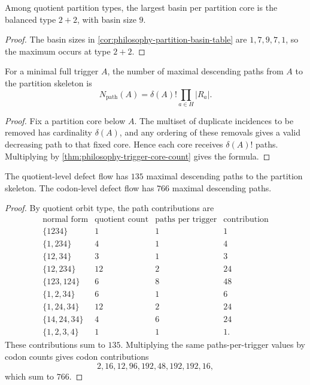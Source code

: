 \begin{corollary}
\label{cor:philosophy-balanced-basin-maximum}
Among quotient partition types, the largest basin per partition core is
the balanced type $2+2$, with basin size $9$.
\end{corollary}
\begin{proof}
The basin sizes in \autoref{cor:philosophy-partition-basin-table} are
$1,7,9,7,1$, so the maximum occurs at type $2+2$.
\end{proof}

\begin{theorem}
\label{thm:philosophy-descending-path-count}
For a minimal full trigger $A$, the number of maximal descending paths
from $A$ to the partition skeleton is
$$
  N_{\mathrm{path}}(A)
  =
  \delta(A)!
  \prod_{a\in H}|R_{a}|.
$$
\end{theorem}
\begin{proof}
Fix a partition core below $A$. The multiset of duplicate incidences to
be removed has cardinality $\delta(A)$, and any ordering of these
removals gives a valid decreasing path to that fixed core. Hence each
core receives $\delta(A)!$ paths. Multiplying by
\autoref{thm:philosophy-trigger-core-count} gives the formula.
\end{proof}

\begin{theorem}
\label{thm:philosophy-total-descending-paths}
The quotient-level defect flow has $135$ maximal descending paths to the
partition skeleton. The codon-level defect flow has $766$ maximal
descending paths.
\end{theorem}
\begin{proof}
By quotient orbit type, the path contributions are
$$
\begin{array}{c|r|r|r}
  \text{normal form} & \text{quotient count} & \text{paths per trigger} & \text{contribution}\\
  \hline
  \{1234\} & 1 & 1 & 1\\
  \{1,234\} & 4 & 1 & 4\\
  \{12,34\} & 3 & 1 & 3\\
  \{12,234\} & 12 & 2 & 24\\
  \{123,124\} & 6 & 8 & 48\\
  \{1,2,34\} & 6 & 1 & 6\\
  \{1,24,34\} & 12 & 2 & 24\\
  \{14,24,34\} & 4 & 6 & 24\\
  \{1,2,3,4\} & 1 & 1 & 1.
\end{array}
$$
These contributions sum to $135$. Multiplying the same paths-per-trigger
values by codon counts gives codon contributions
$$
  2,16,12,96,192,48,192,192,16,
$$
which sum to $766$.
\end{proof}

